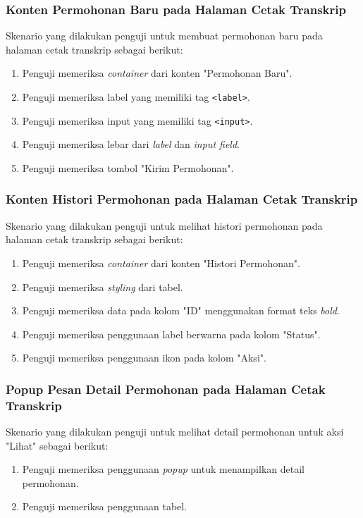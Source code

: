 \subsubsection{Konten Permohonan Baru pada Halaman Cetak Transkrip}
Skenario yang dilakukan penguji untuk membuat permohonan baru pada halaman cetak transkrip sebagai berikut:
\begin{enumerate}
	\item Penguji memeriksa \textit{container} dari konten "Permohonan Baru".
	\item Penguji memeriksa label yang memiliki tag \texttt{<label>}. 
	\item Penguji memeriksa input yang memiliki tag \texttt{<input>}.
	\item Penguji memeriksa lebar dari \textit{label} dan \textit{input field}.
	\item Penguji memeriksa tombol "Kirim Permohonan".	
\end{enumerate}

\subsubsection{Konten Histori Permohonan pada Halaman Cetak Transkrip}
Skenario yang dilakukan penguji untuk melihat histori permohonan pada halaman cetak transkrip sebagai berikut:
\begin{enumerate}
	\item Penguji memeriksa \textit{container} dari konten "Histori Permohonan".
	\item Penguji memeriksa \textit{styling} dari tabel.	
	\item Penguji memeriksa data pada kolom "ID" menggunakan format teks \textit{bold}.
	\item Penguji memeriksa penggunaan label berwarna pada kolom "Status".		
	\item Penguji memeriksa penggunaan ikon pada kolom "Aksi".	
\end{enumerate}

\subsubsection{Popup Pesan Detail Permohonan pada Halaman Cetak Transkrip}
Skenario yang dilakukan penguji untuk melihat detail permohonan untuk aksi "Lihat" sebagai berikut:
\begin{enumerate}
	\item Penguji memeriksa penggunaan \textit{popup} untuk menampilkan detail permohonan.
	\item Penguji memeriksa penggunaan tabel.	
\end{enumerate}

